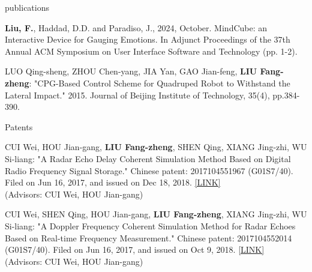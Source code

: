 \documentclass{resume} %
\begin{document}
\begin{rSection}{publications}
\begin{itemlabel}
\item \textbf{Liu, F.}, Haddad, D.D. and Paradiso, J., 2024, October.
MindCube: an Interactive Device for Gauging Emotions.
In Adjunct Proceedings of the 37th Annual ACM Symposium on User Interface Software and Technology (pp. 1-2).
\smallskip
\smallskip
\smallskip

\item LUO Qing-sheng, ZHOU Chen-yang, JIA Yan, GAO Jian-feng, \textbf{LIU Fang-zheng}:
"CPG-Based Control Scheme for Quadruped Robot to Withstand the Lateral Impact."
2015. Journal of Beijing Institute of Technology, 35(4), pp.384-390.
\end{itemlabel}
\end{rSection}

%
\begin{rSection}{Patents}

\begin{itemlabel}
\item CUI Wei, HOU Jian-gang, \textbf{LIU Fang-zheng}, SHEN Qing, XIANG Jing-zhi, WU Si-liang: "A Radar Echo Delay Coherent Simulation Method Based on Digital Radio Frequency Signal Storage." Chinese patent: 2017104551967 (G01S7/40). Filed on Jun 16, 2017, and issued on Dec 18, 2018. \href{http://www.zlqiao.com/zlqiao/patent-f0301af6125548659bae9e05ed9543d6.html}{[LINK]}\\
(Advisors: CUI Wei, HOU Jian-gang)
\smallskip
\smallskip
\smallskip
\item CUI Wei, SHEN Qing, HOU Jian-gang, \textbf{LIU Fang-zheng}, XIANG Jing-zhi, WU Si-liang: "A Doppler Frequency Coherent Simulation Method for Radar Echoes Based on Real-time Frequency Measurement." Chinese patent: 2017104552014 (G01S7/40). Filed on Jun 16, 2017, and issued on Oct 9, 2018. \href{http://www.zlqiao.com/zlqiao/patent-4dc7dd85795d40a08320e507561834ca.html}{[LINK]}\\
(Advisors: CUI Wei, HOU Jian-gang)
\end{itemlabel}
\end{rSection}

%

\end{document}
